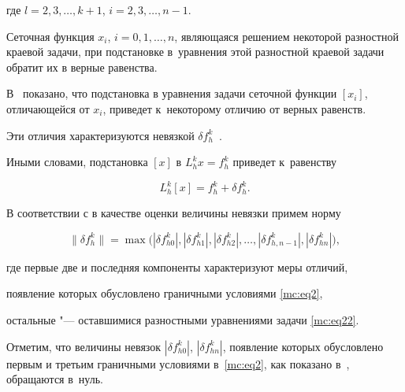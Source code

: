 где $   l=2,  3,  \dots,  k+1$, $   i=2,  3,  \dots,  n-1$.



\smallskip




Сеточная функция $x_i$, $i=0,  1,  \dots,  n$, являющаяся решением некоторой разностной краевой задачи, при подстановке в~уравнения этой разностной краевой задачи обратит их в верные равенства. 

В~\cite{mc:bib6} показано, что подстановка в уравнения задачи сеточной функции $[x_i]$, отличающейся от $x_i$, приведет к~некоторому отличию от верных равенств. 

Эти отличия характеризуются невязкой  $\delta f_h^k$~\cite{mc:bib6}. 

Иными словами, подстановка  $[x]$ в $L_h^kx=f_h^k$  приведет к~равенству

\begin{equation}

\label{mc:eq25}

L_h^k[x]=f_h^k+\delta f_h^k.

\end{equation}







В соответствии с \cite{mc:bib6} в качестве оценки величины невязки примем норму

\begin{equation}

\label{mc:eq25A}

\|\delta f_h^k\| %

=\max\bigl(|\delta f_{h0}^k|,  |\delta f_{h1}^k|,  

|\delta f_{h2}^k|,  \dots,  |\delta f_{h,n-1}^k|,  |\delta f_{hn}^k|\bigr),

\end{equation}

где первые две и последняя компоненты характеризуют меры отличий, 

появление которых обусловлено граничными условиями  \eqref{mc:eq2}, 

остальные "--- оставшимися разностными уравнениями задачи \eqref{mc:eq22}. 

Отметим, что величины невязок $|\delta f_{h0}^k|$,  $|\delta f_{hn}^k|$, появление которых обусловлено  первым и третьим граничными условиями в~\eqref{mc:eq2}, как показано в~\cite{mc:bib6}, обращаются в~нуль.



